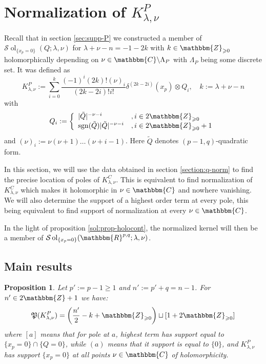 \documentclass{article}
\newcommand{\assign}{:=}
\newcommand{\tmop}[1]{\ensuremath{\operatorname{#1}}}
\numberwithin{definition}{section}
\numberwithin{lemma}{section}
\newtheorem{proposition}{Proposition}
\numberwithin{proposition}{section}
{\theorembodyfont{\rmfamily}\newtheorem{remark}{Remark}
\numberwithin{remark}{section}
}
\begin{document}
\section{Normalization of $K_{\lambda, \nu}^P$}\label{sec:KP-normalization}

Recall that in section \ref{sec:supp-P} we constructed a member of
$\mathcal{S} \tmop{ol}_{\{ x_p = 0 \}} ( Q ; \lambda, \nu)$ for $\lambda + \nu
- n = - 1 - 2 k$ with $k \in \mathbbm{Z}_{\geqslant 0}$ holomorphically
depending on $\nu \in \mathbbm{C}\backslash \Lambda_P$ with $\Lambda_P$ being
some discrete set. It was defined as
\begin{equation}
  K_{\lambda, \nu}^P \assign \sum_{i = 0}^k \frac{( - 1)^i ( 2 k) ! (
  \nu)_i}{( 2 k - 2 i) !i!} \delta^{( 2 k - 2 i)} ( x_p) \otimes Q_i,
  \hspace{1em} k \assign \lambda + \nu - n
\end{equation}
with
\[ Q_i \assign \left\{ \begin{array}{ll}
     | \tilde{Q} |^{- \nu - i} & , i \in 2\mathbbm{Z}_{\geqslant 0}\\
     \tmop{sgn} ( \tilde{Q}) | \tilde{Q} |^{- \nu - i} & , i \in
     2\mathbbm{Z}_{\geqslant 0} + 1
   \end{array} \right. \]
and $( \nu)_i \assign \nu ( \nu + 1) \ldots ( \nu + i - 1)$. Here
$\tilde{Q}$ denotes $( p - 1, q)$-quadratic form.

In this section, we will use the data obtained in section \ref{section:q-norm}
to find the precise location of poles of $K_{\lambda, \nu}^C$. This is
equivalent to find normalization of $K_{\lambda, \nu}^C$ which makes it
holomorphic in $\nu \in \mathbbm{C}$ and nowhere vanishing. We will also
determine the support of a highest order term at every pole, this being
equivalent to find support of normalization at every $\nu \in \mathbbm{C}$.

In the light of proposition \ref{sol:prop-holocont}, the normalized kernel
will then be a member of $\mathcal{S} \tmop{ol}_{\{ x_p = 0 \}} (
\mathbbm{R}^{p, q} ; \lambda, \nu)$.

\subsection{Main results}

\begin{proposition}
  \label{KP-normalization-2:prop-1}Let $p' \assign p - 1 \geqslant 1$ and $n'
  \assign p' + q = n - 1$. For $n' \in 2\mathbbm{Z}+ 1$ we have:
  \[ \mathfrak{P} ( K_{\lambda, \nu}^P) = \left( \frac{n'}{2} - k
     +\mathbbm{Z}_{\geqslant 0} \right) \sqcup [ 1 + 2\mathbbm{Z}_{\geqslant
     0}] \]
  where $[ a]$ means that for pole at $a$, highest term has support equal to
  $\{ x_p = 0 \} \cap \{ Q = 0 \}$, while $( a)$ means that it support is
  equal to $\{ 0 \}$, and $K_{\lambda, \nu}^P$ has support $\{ x_p = 0 \}$ at
  all points $\nu \in \mathbbm{C}$ of holomorphicity.
\end{proposition}
\end{document}
